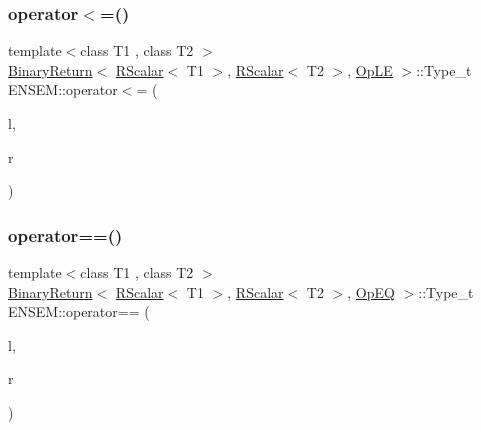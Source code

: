 \mbox{\label{group__rscalar_ga17ac158bc4a28aed7618e341087e8084}} 
\subsubsection{\texorpdfstring{operator$<$=()}{operator<=()}}
{\footnotesize\ttfamily template$<$class T1 , class T2 $>$ \\
\mbox{\hyperlink{structENSEM_1_1BinaryReturn}{Binary\+Return}}$<$ \mbox{\hyperlink{classENSEM_1_1RScalar}{R\+Scalar}}$<$ T1 $>$, \mbox{\hyperlink{classENSEM_1_1RScalar}{R\+Scalar}}$<$ T2 $>$, \mbox{\hyperlink{structENSEM_1_1OpLE}{Op\+LE}} $>$\+::Type\+\_\+t E\+N\+S\+E\+M\+::operator$<$= (\begin{DoxyParamCaption}\item[{const \mbox{\hyperlink{classENSEM_1_1RScalar}{R\+Scalar}}$<$ T1 $>$ \&}]{l,  }\item[{const \mbox{\hyperlink{classENSEM_1_1RScalar}{R\+Scalar}}$<$ T2 $>$ \&}]{r }\end{DoxyParamCaption})\hspace{0.3cm}{\ttfamily [inline]}}

\mbox{\label{group__rscalar_ga7c4b4d964b61ea096a84dc01a77fee5b}} 
\subsubsection{\texorpdfstring{operator==()}{operator==()}}
{\footnotesize\ttfamily template$<$class T1 , class T2 $>$ \\
\mbox{\hyperlink{structENSEM_1_1BinaryReturn}{Binary\+Return}}$<$ \mbox{\hyperlink{classENSEM_1_1RScalar}{R\+Scalar}}$<$ T1 $>$, \mbox{\hyperlink{classENSEM_1_1RScalar}{R\+Scalar}}$<$ T2 $>$, \mbox{\hyperlink{structENSEM_1_1OpEQ}{Op\+EQ}} $>$\+::Type\+\_\+t E\+N\+S\+E\+M\+::operator== (\begin{DoxyParamCaption}\item[{const \mbox{\hyperlink{classENSEM_1_1RScalar}{R\+Scalar}}$<$ T1 $>$ \&}]{l,  }\item[{const \mbox{\hyperlink{classENSEM_1_1RScalar}{R\+Scalar}}$<$ T2 $>$ \&}]{r }\end{DoxyParamCaption})\hspace{0.3cm}{\ttfamily [inline]}}


